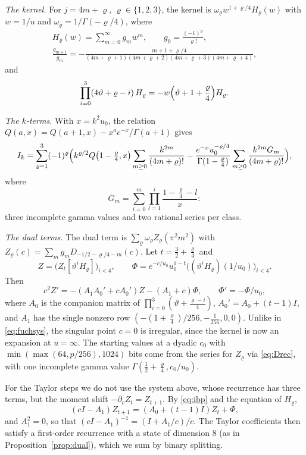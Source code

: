 \documentclass[11pt,reqno]{amsart}
\theoremstyle{definition}
\theoremstyle{remark}
\begin{document}
\emph{The kernel.} For $j = 4m+\varrho$, $\varrho \in \{1,2,3\}$, the kernel is $\omega_\varrho w^{1+\varrho/4}H_\varrho(w)$
with $w = 1/u$ and $\omega_\varrho = 1/\Gamma(-\varrho/4)$, where
\begin{gather*}
  H_\varrho(w) = \sum_{m=0}^{\infty}g_mw^m, \qquad g_0 = \frac{(-1)^\varrho}{\varrho!}, \\
  \frac{g_{m+1}}{g_m} = -\frac{m+1+\varrho/4}{(4m+\varrho+1)(4m+\varrho+2)(4m+\varrho+3)(4m+\varrho+4)},
\end{gather*}
and
\[
  \prod_{i=0}^{3}(4\vartheta+\varrho-i)\,H_\varrho = -w\Bigl(\vartheta+1+\frac\varrho4\Bigr)H_\varrho.
\]

\emph{The $k$-terms.} With $x = k^2u_0$, the relation $Q(a,x) = Q(a+1,x) - x^ae^{-x}/\Gamma(a+1)$ gives
\[
  I_k = \sum_{\varrho=1}^{3}(-1)^\varrho\Bigl(k^{\varrho/2}Q\bigl(1-\tfrac\varrho4,x\bigr)\sum_{m\ge0}\frac{k^{2m}}{(4m+\varrho)!}
  - \frac{e^{-x}u_0^{-\varrho/4}}{\Gamma(1-\frac\varrho4)}\sum_{m\ge0}\frac{k^{2m}G_m}{(4m+\varrho)!}\Bigr),
\]
where
\[
  G_m = \sum_{i=0}^{m}\prod_{l=1}^{i}\frac{1-\frac\varrho4-l}{x}:
\]
three incomplete gamma values and two rational series per class.

\emph{The dual terms.} The dual term is $\sum_\varrho\omega_\varrho Z_\varrho(\pi^2m^2)$ with
$Z_\varrho(c) = \sum_mg_mD_{-1/2-\varrho/4-m}(c)$. Let $t = \frac32 + \frac\varrho4$ and
\[
  Z = \bigl(Z_t[\vartheta^iH_\varrho]\bigr)_{i<4}, \qquad
  \Phi = e^{-c/u_0}u_0^{1-t}\bigl((\vartheta^iH_\varrho)(1/u_0)\bigr)_{i<4}.
\]
Then
\[
  c^2Z' = -(A_1A_0' + cA_0')Z - (A_1 + c)\Phi, \qquad \Phi' = -\Phi/u_0,
\]
where $A_0$ is the companion matrix of $\prod_{i=0}^{3}(\vartheta + \frac{\varrho-i}4)$, $A_0' = A_0 + (t-1)I$, and
$A_1$ has the single nonzero row $(-(1+\frac\varrho4)/256, -\frac1{256}, 0, 0)$. Unlike in \eqref{eq:fuchsys}, the
singular point $c = 0$ is irregular, since the kernel is now an expansion at $u = \infty$. The starting values at a
dyadic $c_0$ with $\min(\max(64, p/256), 1024)$ bits come from the series for $Z_\varrho$ via \eqref{eq:Drec}, with one
incomplete gamma value $\Gamma(\frac12+\frac\varrho4, c_0/u_0)$.

For the Taylor steps we do not use the system above, whose recurrence has three terms, but the moment shift
$-\partial_cZ_t = Z_{t+1}$. By \eqref{eq:ibp} and the equation of $H_\varrho$,
\[
  (cI - A_1)Z_{t+1} = (A_0 + (t-1)I)Z_t + \Phi,
\]
and $A_1^2 = 0$, so that $(cI - A_1)^{-1} = (I + A_1/c)/c$. The Taylor coefficients then satisfy a first-order
recurrence with a state of dimension $8$ (as in Proposition~\ref{prop:dual}), which we sum by binary splitting.
\end{document}
